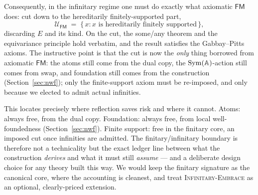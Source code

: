 Consequently, in the infinitary regime one must do exactly what axiomatic
$\mathsf{FM}$ does: cut down to the hereditarily finitely-supported part,
\[
  \mathcal{U}_{\mathsf{FM}} \;=\; \{\, x : x \text{ is hereditarily finitely supported}\,\},
\]
discarding $E$ and its kind. On the cut, the some/any theorem and the
equivariance principle hold verbatim, and the result satisfies the Gabbay--Pitts
axioms. The instructive point is that the cut is now the \emph{only} thing
borrowed from axiomatic $\mathsf{FM}$: the atoms still come from the dual copy,
the $\mathrm{Sym}(\mathbb{A})$-action still comes from $\mathrm{swap}$, and foundation still
comes from the construction (Section~\ref{sec:nwf}); only the finite-support
axiom must be re-imposed, and only because we elected to admit actual infinities.

This locates precisely where reflection saves risk and where it cannot. Atoms:
always free, from the dual copy. Foundation: always free, from local
well-foundedness (Section~\ref{sec:nwf}). Finite support: free in the finitary
core, an imposed cut once infinities are admitted. The finitary/infinitary
boundary is therefore not a technicality but the exact ledger line between what
the construction \emph{derives} and what it must still \emph{assume} --- and a
deliberate design choice for any theory built this way. We would keep the
finitary signature as the canonical core, where the accounting is cleanest, and
treat \textsc{Infinitary-Embrace} as an optional, clearly-priced extension.
